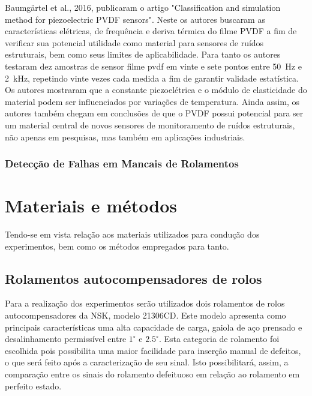 \documentclass[
	12pt,				
	oneside,			
	a4paper,			
	english,			
	brazil,			
	]{abntex2ppgsi}
\begin{document}
Baumgärtel et al., 2016, publicaram o artigo "Classification and simulation method for piezoelectric PVDF sensors". Neste os autores buscaram as características elétricas, de frequência e deriva térmica do filme PVDF a fim de verificar sua potencial utilidade como material para sensores de ruídos estruturais, bem como seus limites de aplicabilidade. Para tanto os autores testaram dez amostras de sensor filme pvdf em vinte e sete pontos entre \SI{50}{\hertz} e \SI{2}{\kilo\hertz}, repetindo vinte vezes cada medida a fim de garantir validade estatística. Os autores mostraram que a constante piezoelétrica e o módulo de elasticidade do material podem ser influenciados por variações de temperatura. Ainda assim, os autores também chegam em conclusões de que o PVDF possui potencial para ser um material central de novos sensores de monitoramento de ruídos estruturais, não apenas em pesquisas, mas também em aplicações industriais.



\subsection{\textbf{Detecção de Falhas em Mancais de Rolamentos}}

\chapter{Materiais e métodos}

Tendo-se em vista relação aos materiais utilizados para condução dos experimentos, bem como os métodos empregados para tanto.

\section{\textbf{Rolamentos autocompensadores de rolos}}

Para a realização dos experimentos serão utilizados dois rolamentos de rolos autocompensadores da NSK, modelo 21306CD. Este modelo apresenta como principais características uma alta capacidade de carga, gaiola de aço prensado e desalinhamento permissível entre $1^{\circ}$ e $2.5^{\circ}$. Esta categoria de rolamento foi escolhida pois possibilita uma maior facilidade para inserção manual de defeitos, o que será feito após a caracterização de seu sinal. Isto possibilitará, assim, a comparação entre os sinais do rolamento defeituoso em relação ao rolamento em perfeito estado. 
\end{document}
